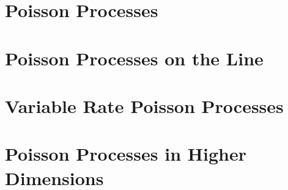 \section{Poisson Processes}
\section{Poisson Processes on the Line}
\section{Variable Rate Poisson Processes}
\section{Poisson Processes in Higher Dimensions} 